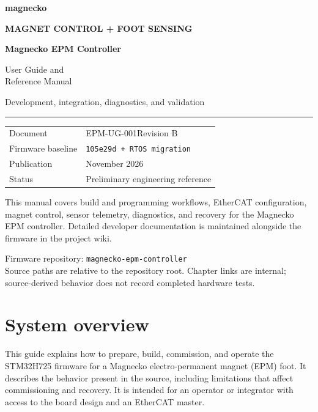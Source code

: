 \documentclass[10pt,a4paper,oneside]{report}
\newcommand{\ProductName}{Magnecko EPM Controller}
\newcommand{\SourceBaseline}{105e29d + RTOS migration}
\newcommand{\DocumentID}{EPM-UG-001}
\newcommand{\DocumentRevision}{B}
\newcommand{\DocumentDate}{November 2026}
\begin{document}
\raggedright
\hypersetup{pageanchor=false}
\begin{titlepage}
\thispagestyle{empty}
{\color{MGSRed}\Large\bfseries magnecko}\par
\vspace{22mm}
{\color{MGSRed}\small\bfseries MAGNET CONTROL + FOOT SENSING}\par
\vspace{4mm}
{\fontsize{32}{38}\selectfont\bfseries\ProductName}\par
\vspace{6mm}
{\fontsize{22}{29}\selectfont User Guide and\\Reference Manual\par}
\vspace{10mm}
{\large Development, integration, diagnostics, and validation}\par
\vspace{9mm}
\textcolor{MGSRed}{\rule{\linewidth}{1.2pt}}\par
\vspace{8mm}
\begin{tabular}{@{}ll}
Document & \DocumentID\quad Revision \DocumentRevision \\
Firmware baseline & \texttt{\SourceBaseline} \\
Publication & \DocumentDate \\
Status & Preliminary engineering reference
\end{tabular}
\vfill
{\small This manual covers build and programming workflows, EtherCAT
configuration, magnet control, sensor telemetry, diagnostics, and recovery
for the Magnecko EPM controller. Detailed developer documentation is
maintained alongside the firmware in the project wiki.\par}
\vspace{6mm}
{\small\color{MGSMuted}Firmware repository: \texttt{magnecko-epm-controller}\\
Source paths are relative to the repository root. Chapter links are internal;
source-derived behavior does not record completed hardware tests.\par}
\end{titlepage}
\hypersetup{pageanchor=true}
\tableofcontents
\clearpage
{}
\chapter{System overview}

This guide explains how to prepare, build, commission, and operate the
STM32H725 firmware for a Magnecko electro-permanent magnet (EPM) foot.
It describes the behavior present in the source, including limitations
that affect commissioning and recovery. It is intended for an operator
or integrator with access to the board design and an EtherCAT master.
\end{document}
